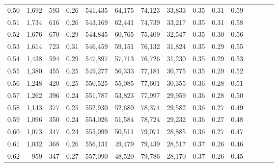 \begin{tabular}{rrrcrrrrrrrrrrr}
0.50 &   1,692 &     593 &                                       0.26 &  541,435 &   64,175 &   74,123 &   33,833 &  0.35 &  0.31 &                         0.59 \\
0.51 &   1,734 &     616 &                                       0.26 &  543,169 &   62,441 &   74,739 &   33,217 &  0.35 &  0.31 &                         0.58 \\
0.52 &   1,676 &     670 &                                       0.29 &  544,845 &   60,765 &   75,409 &   32,547 &  0.35 &  0.30 &                         0.56 \\
0.53 &   1,614 &     723 &                                       0.31 &  546,459 &   59,151 &   76,132 &   31,824 &  0.35 &  0.29 &                         0.55 \\
0.54 &   1,438 &     594 &                                       0.29 &  547,897 &   57,713 &   76,726 &   31,230 &  0.35 &  0.29 &                         0.53 \\
0.55 &   1,380 &     455 &                                       0.25 &  549,277 &   56,333 &   77,181 &   30,775 &  0.35 &  0.29 &                         0.52 \\
0.56 &   1,248 &     420 &                                       0.25 &  550,525 &   55,085 &   77,601 &   30,355 &  0.36 &  0.28 &                         0.51 \\
0.57 &   1,262 &     396 &                                       0.24 &  551,787 &   53,823 &   77,997 &   29,959 &  0.36 &  0.28 &                         0.50 \\
0.58 &   1,143 &     377 &                                       0.25 &  552,930 &   52,680 &   78,374 &   29,582 &  0.36 &  0.27 &                         0.49 \\
0.59 &   1,096 &     350 &                                       0.24 &  554,026 &   51,584 &   78,724 &   29,232 &  0.36 &  0.27 &                         0.48 \\
0.60 &   1,073 &     347 &                                       0.24 &  555,099 &   50,511 &   79,071 &   28,885 &  0.36 &  0.27 &                         0.47 \\
0.61 &   1,032 &     368 &                                       0.26 &  556,131 &   49,479 &   79,439 &   28,517 &  0.37 &  0.26 &                         0.46 \\
0.62 &     959 &     347 &                                       0.27 &  557,090 &   48,520 &   79,786 &   28,170 &  0.37 &  0.26 &                         0.45 \\

\end{tabular}
